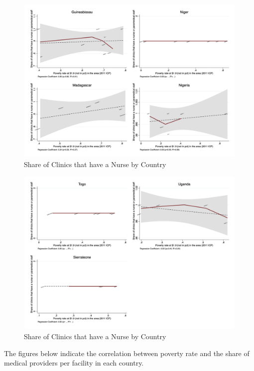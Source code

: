 \documentclass{article}                 %
\begin{document}
			\begin{figure}[H] 
				\centering
				\caption{Share of Clinics that have a Nurse by Country} 
				\includegraphics[width=\textwidth]{"../Output/Final/poverty_fl_2_mednurs"}
			\end{figure}
			
			\begin{figure}[H] 
				\centering
				\caption{Share of Clinics that have a Nurse by Country} 
				\includegraphics[width=\textwidth]{"../Output/Final/poverty_fl_3_mednurs"}
			\end{figure}	
	
	The figures below indicate the correlation between poverty rate and the share of medical providers per facility in each country.
	
\end{document}
